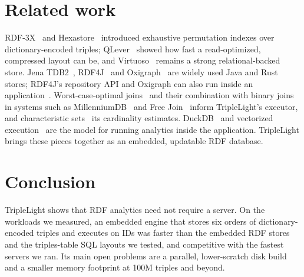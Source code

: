 \documentclass[sigconf,nonacm]{acmart}
\newcommand{\sys}{TripleLight}
\begin{document}
\section{Related work}

RDF-3X~\cite{rdf3x} and Hexastore~\cite{hexastore} introduced exhaustive permutation indexes over dictionary-encoded
triples; QLever~\cite{qlever} showed how fast a read-optimized, compressed layout can be, and Virtuoso~\cite{virtuoso}
remains a strong relational-backed store. Jena TDB2~\cite{jena}, RDF4J~\cite{rdf4j} and Oxigraph~\cite{oxigraph} are
widely used Java and Rust stores; RDF4J's repository API and Oxigraph can also run inside an application~\cite{rdf4jrepo}. Worst-case-optimal joins~\cite{leapfrog} and their
combination with binary joins in systems such as MillenniumDB~\cite{millenniumdb} and Free Join~\cite{freejoin} inform
\sys{}'s executor, and characteristic sets~\cite{charsets} its cardinality estimates. DuckDB~\cite{duckdb} and
vectorized execution~\cite{x100} are the model for running analytics inside the application. \sys{} brings these
pieces together as an embedded, updatable RDF database.

\section{Conclusion}

\sys{} shows that RDF analytics need not require a server. On the workloads we measured, an embedded engine that
stores six orders of dictionary-encoded triples and executes on IDs was faster than the embedded RDF stores and the
triples-table SQL layouts we tested, and competitive with the fastest servers we ran. Its main open problems are a parallel, lower-scratch
disk build and a smaller memory footprint at 100M triples and beyond.



\end{document}
